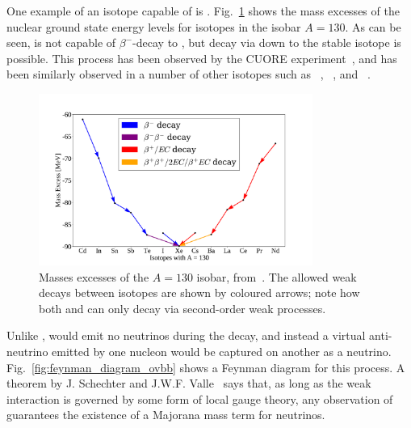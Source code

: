 One example of an isotope capable of \twonbb{} is . Fig.~\ref{fig:bb_isobar_example} shows the mass excesses of the nuclear ground state energy levels for isotopes in the isobar $A = 130$. As can be seen,  is not capable of $\beta^{-}$-decay to , but decay via \twonbb{} down to the stable isotope  is possible. This process has been observed by the CUORE experiment~\cite{adamsMeasurementEnsuremathNu2021}, %
and \twonbb{} has been similarly observed in a number of other isotopes such as ~\cite{agostiniResultsBetaBeta2015}, %
~\cite{gandoPrecisionAnalysis1362019}, %
and ~\cite{arnoldMeasurementEnsuremathNu2016}. %

\begin{figure}[!th]
    \centering
    \includegraphics[width=0.8\textwidth]{1_NeutrinoTheory/Figs/A_130_isobars.pdf}
    \caption[]{Masses excesses of the $A = 130$ isobar, from~\cite{kondevNuclearDataSheets2008}. The allowed weak decays between isotopes are shown by coloured arrows; note how both  and  can only decay via second-order weak processes.}
    \label{fig:bb_isobar_example}
\end{figure}

Unlike \twonbb{}, \onbb{} would emit no neutrinos during the decay, and instead a virtual anti-neutrino emitted by one nucleon would be captured on another as a neutrino. Fig.~\ref{fig:feynman_diagram_ovbb} shows a Feynman diagram for this process. A theorem by J. Schechter and J.W.F. Valle~\cite{schechterNeutrinolessDoubleDecay1982} %
says that, as long as the weak interaction is governed by some form of local gauge theory, any observation of \onbb{} guarantees the existence of a Majorana mass term for neutrinos.

